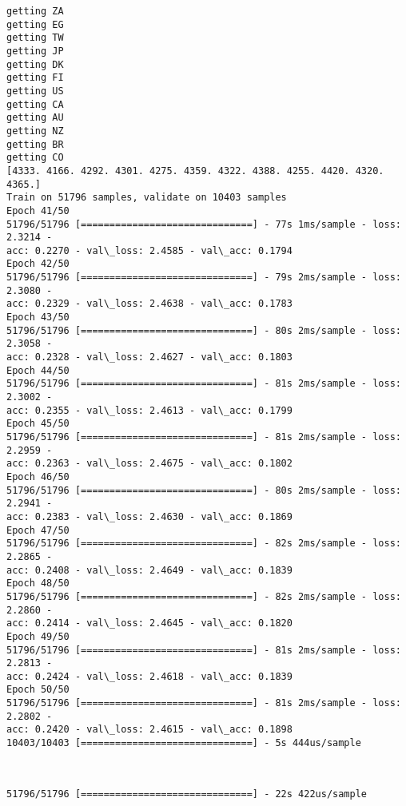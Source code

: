 \documentclass[11pt]{article}
\begin{document}
    \begin{Verbatim}[commandchars=\\\{\}]
getting ZA
getting EG
getting TW
getting JP
getting DK
getting FI
getting US
getting CA
getting AU
getting NZ
getting BR
getting CO
[4333. 4166. 4292. 4301. 4275. 4359. 4322. 4388. 4255. 4420. 4320. 4365.]
Train on 51796 samples, validate on 10403 samples
Epoch 41/50
51796/51796 [==============================] - 77s 1ms/sample - loss: 2.3214 -
acc: 0.2270 - val\_loss: 2.4585 - val\_acc: 0.1794
Epoch 42/50
51796/51796 [==============================] - 79s 2ms/sample - loss: 2.3080 -
acc: 0.2329 - val\_loss: 2.4638 - val\_acc: 0.1783
Epoch 43/50
51796/51796 [==============================] - 80s 2ms/sample - loss: 2.3058 -
acc: 0.2328 - val\_loss: 2.4627 - val\_acc: 0.1803
Epoch 44/50
51796/51796 [==============================] - 81s 2ms/sample - loss: 2.3002 -
acc: 0.2355 - val\_loss: 2.4613 - val\_acc: 0.1799
Epoch 45/50
51796/51796 [==============================] - 81s 2ms/sample - loss: 2.2959 -
acc: 0.2363 - val\_loss: 2.4675 - val\_acc: 0.1802
Epoch 46/50
51796/51796 [==============================] - 80s 2ms/sample - loss: 2.2941 -
acc: 0.2383 - val\_loss: 2.4630 - val\_acc: 0.1869
Epoch 47/50
51796/51796 [==============================] - 82s 2ms/sample - loss: 2.2865 -
acc: 0.2408 - val\_loss: 2.4649 - val\_acc: 0.1839
Epoch 48/50
51796/51796 [==============================] - 82s 2ms/sample - loss: 2.2860 -
acc: 0.2414 - val\_loss: 2.4645 - val\_acc: 0.1820
Epoch 49/50
51796/51796 [==============================] - 81s 2ms/sample - loss: 2.2813 -
acc: 0.2424 - val\_loss: 2.4618 - val\_acc: 0.1839
Epoch 50/50
51796/51796 [==============================] - 81s 2ms/sample - loss: 2.2802 -
acc: 0.2420 - val\_loss: 2.4615 - val\_acc: 0.1898
10403/10403 [==============================] - 5s 444us/sample
    \end{Verbatim}

    \begin{center}
    \end{center}
    { \hspace*{\fill} \\}
    
    \begin{Verbatim}[commandchars=\\\{\}]
51796/51796 [==============================] - 22s 422us/sample
    \end{Verbatim}

    \begin{center}
    \end{center}
    { \hspace*{\fill} \\}
    
\end{document}
